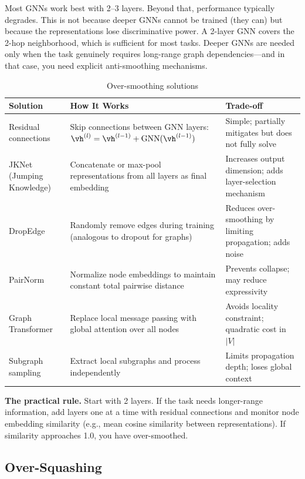 \begin{keyinsight}
Most GNNs work best with 2--3 layers. Beyond that, performance typically degrades. This is not because deeper GNNs cannot be trained (they can) but because the representations lose discriminative power. A 2-layer GNN covers the 2-hop neighborhood, which is sufficient for most tasks. Deeper GNNs are needed only when the task genuinely requires long-range graph dependencies---and in that case, you need explicit anti-smoothing mechanisms.
\end{keyinsight}

\begin{table}[H]
\centering
\caption{Over-smoothing solutions}
\begin{tabularx}{\textwidth}{lXX}
\toprule
\textbf{Solution} & \textbf{How It Works} & \textbf{Trade-off} \\
\midrule
Residual connections & Skip connections between GNN layers: $\vh^{(l)} = \vh^{(l-1)} + \text{GNN}(\vh^{(l-1)})$ & Simple; partially mitigates but does not fully solve \\
JKNet (Jumping Knowledge) & Concatenate or max-pool representations from all layers as final embedding & Increases output dimension; adds layer-selection mechanism \\
DropEdge & Randomly remove edges during training (analogous to dropout for graphs) & Reduces over-smoothing by limiting propagation; adds noise \\
PairNorm & Normalize node embeddings to maintain constant total pairwise distance & Prevents collapse; may reduce expressivity \\
Graph Transformer & Replace local message passing with global attention over all nodes & Avoids locality constraint; quadratic cost in $|V|$ \\
Subgraph sampling & Extract local subgraphs and process independently & Limits propagation depth; loses global context \\
\bottomrule
\end{tabularx}
\end{table}

\textbf{The practical rule.} Start with 2 layers. If the task needs longer-range information, add layers one at a time with residual connections and monitor node embedding similarity (e.g., mean cosine similarity between representations). If similarity approaches 1.0, you have over-smoothed.

\subsection{Over-Squashing}

